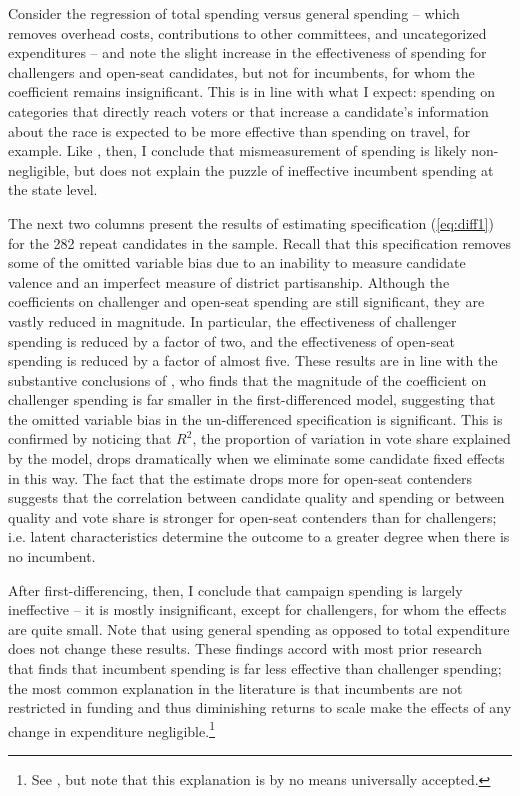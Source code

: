 \documentclass{article}
\begin{document}
Consider the regression of total spending versus general spending -- which removes overhead costs, contributions to other committees, and uncategorized expenditures -- and note the slight increase in the effectiveness of spending for challengers and open-seat candidates, but not for incumbents, for whom the coefficient remains insignificant. This is in line with what I expect: spending on categories that directly reach voters or that increase a candidate's information about the race is expected to be more effective than spending on travel, for example. Like \cite{ansolabehere1994mismeasure}, then, I conclude that mismeasurement of spending is likely non-negligible, but does not explain the puzzle of ineffective incumbent spending at the state level.

The next two columns present the results of estimating specification (\ref{eq:diff1}) for the 282 repeat candidates in the sample. Recall that this specification removes some of the omitted variable bias due to an inability to measure candidate valence and an imperfect measure of district partisanship. Although the coefficients on challenger and open-seat spending are still significant, they are vastly reduced in magnitude. In particular, the effectiveness of challenger spending is reduced by a factor of two, and the effectiveness of open-seat spending is reduced by a factor of almost five. These results are in line with the substantive conclusions of \cite{levitt-1994}, who finds that the magnitude of the coefficient on challenger spending is far smaller in the first-differenced model, suggesting that the omitted variable bias in the un-differenced specification is significant. This is confirmed by noticing that $R^2$, the proportion of variation in vote share explained by the model, drops dramatically when we eliminate some candidate fixed effects in this way. The fact that the estimate drops more for open-seat contenders suggests that the correlation between candidate quality and spending or between quality and vote share is stronger for open-seat contenders than for challengers; i.e. latent characteristics determine the outcome to a greater degree when there is no incumbent.

After first-differencing, then, I conclude that campaign spending is largely ineffective -- it is mostly insignificant, except for challengers, for whom the effects are quite small. Note that using general spending as opposed to total expenditure does not change these results. These findings accord with most prior research that finds that incumbent spending is far less effective than challenger spending; the most common explanation in the literature is that incumbents are not restricted in funding and thus diminishing returns to scale make the effects of any change in expenditure negligible.\footnote{See \cite{stratmann2006contribution}, but note that this explanation is by no means universally accepted.}
\end{document}

